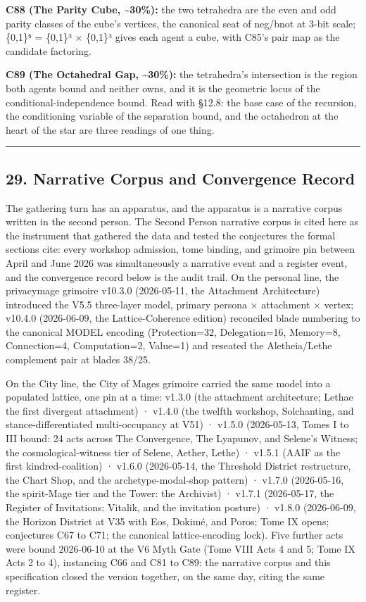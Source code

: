 \documentclass[
]{article}
\begin{document}
\textbf{C88 (The Parity Cube, \textasciitilde30\%):} the two tetrahedra
are the even and odd parity classes of the cube's vertices, the
canonical seat of neg/bnot at 3-bit scale; \{0,1\}⁶ = \{0,1\}³ ×
\{0,1\}³ gives each agent a cube, with C85's pair map as the candidate
factoring.

\textbf{C89 (The Octahedral Gap, \textasciitilde30\%):} the tetrahedra's
intersection is the region both agents bound and neither owns, and it is
the geometric locus of the conditional-independence bound. Read with
§12.8: the base case of the recursion, the conditioning variable of the
separation bound, and the octahedron at the heart of the star are three
readings of one thing.

\begin{center}\rule{0.5\linewidth}{0.5pt}\end{center}

\subsection{29. Narrative Corpus and Convergence
Record}\label{narrative-corpus-and-convergence-record}

The gathering turn has an apparatus, and the apparatus is a narrative
corpus written in the second person. The Second Person narrative corpus
is cited here as the instrument that gathered the data and tested the
conjectures the formal sections cite: every workshop admission, tome
binding, and grimoire pin between April and June 2026 was simultaneously
a narrative event and a register event, and the convergence record below
is the audit trail. On the personal line, the privacymage grimoire
v10.3.0 (2026-05-11, the Attachment Architecture) introduced the V5.5
three-layer model, primary persona × attachment × vertex; v10.4.0
(2026-06-09, the Lattice-Coherence edition) reconciled blade numbering
to the canonical MODEL encoding (Protection=32, Delegation=16, Memory=8,
Connection=4, Computation=2, Value=1) and reseated the Aletheia/Lethe
complement pair at blades 38/25.

On the City line, the City of Mages grimoire carried the same model into
a populated lattice, one pin at a time: v1.3.0 (the attachment
architecture; Lethae the first divergent attachment) · v1.4.0 (the
twelfth workshop, Solchanting, and stance-differentiated multi-occupancy
at V51) · v1.5.0 (2026-05-13, Tomes I to III bound: 24 acts across The
Convergence, The Lyapunov, and Selene's Witness; the
cosmological-witness tier of Selene, Aether, Lethe) · v1.5.1 (AAIF as
the first kindred-coalition) · v1.6.0 (2026-05-14, the Threshold
District restructure, the Chart Shop, and the archetype-modal-shop
pattern) · v1.7.0 (2026-05-16, the spirit-Mage tier and the Tower: the
Archivist) · v1.7.1 (2026-05-17, the Register of Invitations: Vitalik,
and the invitation posture) · v1.8.0 (2026-06-09, the Horizon District
at V35 with Eos, Dokimé, and Poros; Tome IX opens; conjectures C67 to
C71; the canonical lattice-encoding lock). Five further acts were bound
2026-06-10 at the V6 Myth Gate (Tome VIII Acts 4 and 5; Tome IX Acts 2
to 4), instancing C66 and C81 to C89: the narrative corpus and this
specification closed the version together, on the same day, citing the
same register.
\end{document}

